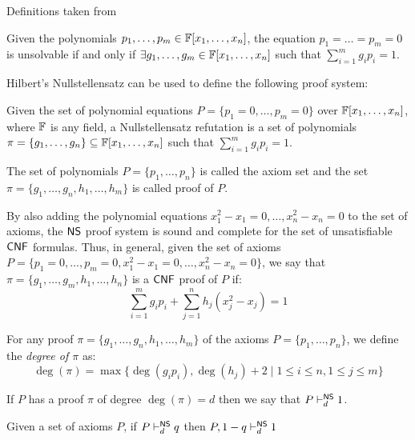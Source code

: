 Definitions taken from \cite{Nullstellensatz}

\begin{definition}
    Given the polynomials $p_1, \ldots, p_m \in \mathbb{F}[x_1, \ldots, x_n]$, the equation $p_1 = \ldots = p_m = 0$ is unsolvable if and only if $\exists g_1, \ldots, g_m \in \mathbb{F}[x_1, \ldots, x_n]$ such that $\sum\limits_{i = 1}^m g_i p_i = 1$.
\end{definition}

Hilbert's Nullstellensatz can be used to define the following proof system:

\begin{definition}
    Given the set of polynomial equations $P = \{p_1 = 0, \ldots, p_m = 0\}$ over $\mathbb{F}[x_1, \ldots, x_n]$, where $\mathbb{F}$ is any field, a Nullstellensatz refutation is a set of polynomials $\pi = \{g_1, \ldots, g_n\} \subseteq \mathbb{F}[x_1, \ldots, x_n]$ such that $\sum\limits_{i = 1}^m g_i p_i = 1$.

    The set of polynomials $P = \{p_1, \ldots, p_n\}$ is called the axiom set and the set $\pi = \{g_1, \ldots, g_n, h_1, \ldots, h_m\}$ is called proof of $P$.
\end{definition}

By also adding the polynomial equations $x_1^2-x_1 = 0, \ldots, x_n^2-x_n = 0$ to the set of axioms, the $\mathsf{NS}$ proof system is sound and complete for the set of unsatisfiable $\mathsf{CNF}$ formulas. Thus, in general, given the set of axioms $P = \{p_1 = 0, \ldots, p_m = 0, x_1^2-x_1 = 0, \ldots, x_n^2-x_n = 0\}$, we say that $\pi = \{g_1, \ldots, g_m, h_1, \ldots, h_n\}$ is a $\mathsf{CNF}$ proof of $P$ if:
\[\sum_{i = 1}^m g_i p_i + \sum_{j = 1}^n h_j (x_j^2-x_j) = 1\]

For any proof $\pi = \{g_1, \ldots, g_n, h_1, \ldots, h_m\}$ of the axioms $P = \{p_1, \ldots, p_n\}$, we define the \textit{degree of $\pi$} as:
\[\deg(\pi) = \max\{\deg(g_i p_i), \deg(h_j) + 2 \mid 1 \leq i \leq n, 1 \leq j \leq m\}\]

If $P$ has a proof $\pi$ of degree $\deg(\pi) = d$ then we say that $P \vdash^{\mathsf{NS}}_d 1$.

\begin{proposition}
    \label{neg_refutation}
    Given a set of axioms $P$, if $P \vdash^{\mathsf{NS}}_d q$ then $P, 1-q \vdash^{\mathsf{NS}}_d 1$ 
\end{proposition}

